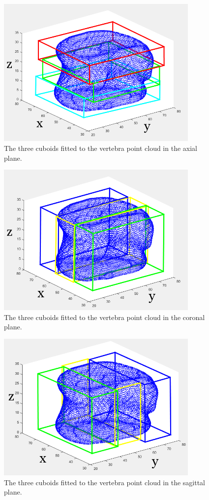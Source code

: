 \begin{figure}[ht!]
  \centering
  \includegraphics[width=3.9in]{Chapters/Chapter_PCA_images/Cuboid_fit_axial.png}
  \caption{The three cuboids fitted to the vertebra point cloud in the axial plane.}
  \label{fig:cuboid_ax}
\end{figure}

\begin{figure}[ht!]
  \centering
  \includegraphics[width=3.9in]{Chapters/Chapter_PCA_images/Cuboid_fit_coronal.png}
  \caption{The three cuboids fitted to the vertebra point cloud in the coronal plane.}
  \label{fig:cuboid_cor}
\end{figure}

\begin{figure}[ht!]
  \centering
  \includegraphics[width=3.9in]{Chapters/Chapter_PCA_images/Cuboid_fit_sagital.png}
  \caption{The three cuboids fitted to the vertebra point cloud in the sagittal plane.}
  \label{fig:cuboid_sag}
\end{figure}

